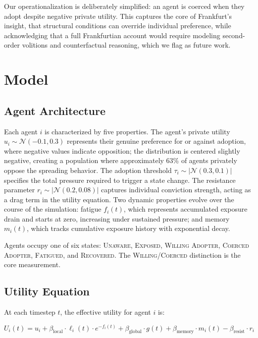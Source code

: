 \documentclass[11pt, a4paper]{article}
\newcommand{\betalocal}{\beta_{\text{local}}}
\newcommand{\betaglobal}{\beta_{\text{global}}}
\newcommand{\betamemory}{\beta_{\text{memory}}}
\newcommand{\betaresist}{\beta_{\text{resist}}}
\begin{document}
Our operationalization is deliberately simplified: an agent is coerced when they adopt despite negative private utility. This captures the core of Frankfurt's insight, that structural conditions can override individual preference, while acknowledging that a full Frankfurtian account would require modeling second-order volitions and counterfactual reasoning, which we flag as future work.

\section{Model}
\label{sec:model}

\subsection{Agent Architecture}

Each agent $i$ is characterized by five properties. The agent's private utility $u_i \sim \mathcal{N}(-0.1, 0.3)$ represents their genuine preference for or against adoption, where negative values indicate opposition; the distribution is centered slightly negative, creating a population where approximately 63\% of agents privately oppose the spreading behavior. The adoption threshold $\tau_i \sim |\mathcal{N}(0.3, 0.1)|$ specifies the total pressure required to trigger a state change. The resistance parameter $r_i \sim |\mathcal{N}(0.2, 0.08)|$ captures individual conviction strength, acting as a drag term in the utility equation. Two dynamic properties evolve over the course of the simulation: fatigue $f_i(t)$, which represents accumulated exposure drain and starts at zero, increasing under sustained pressure; and memory $m_i(t)$, which tracks cumulative exposure history with exponential decay.

Agents occupy one of six states: \textsc{Unaware}, \textsc{Exposed}, \textsc{Willing Adopter}, \textsc{Coerced Adopter}, \textsc{Fatigued}, and \textsc{Recovered}. The \textsc{Willing}/\textsc{Coerced} distinction is the core measurement.

\subsection{Utility Equation}

At each timestep $t$, the effective utility for agent $i$ is:

\begin{equation}
    U_i(t) = u_i + \betalocal \cdot \ell_i(t) \cdot e^{-f_i(t)} + \betaglobal \cdot g(t) + \betamemory \cdot m_i(t) - \betaresist \cdot r_i
    \label{eq:utility}
\end{equation}
\end{document}
